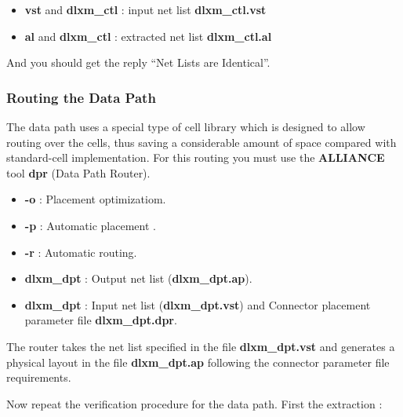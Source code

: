 \begin{itemize}
\item
{\bf vst} and {\bf dlxm\_ctl} : input net list {\bf dlxm\_ctl.vst}
\item
{\bf al} and {\bf dlxm\_ctl} : extracted net list {\bf dlxm\_ctl.al}
\end{itemize}

And you should get the reply ``Net Lists are Identical''.


    		\subsubsection{Routing the Data Path}

The data path uses a special type of cell library which is designed to allow routing over the cells, thus saving a considerable amount of space compared with standard-cell implementation. For this routing you must use the {\bf ALLIANCE} tool {\bf dpr} (Data Path Router).




\begin {itemize}
\item {\bf -o} : Placement optimizatiom.
\item {\bf -p} : Automatic placement .
\item {\bf -r} : Automatic  routing.
\item {\bf dlxm\_dpt} : Output net list ({\bf dlxm\_dpt.ap}).
\item {\bf dlxm\_dpt} : Input net list ({\bf dlxm\_dpt.vst}) and
Connector placement parameter file {\bf
dlxm\_dpt.dpr}.
\end{itemize}

The router takes the net list specified in the file {\bf
dlxm\_dpt.vst} and generates a physical layout in the file {\bf
dlxm\_dpt.ap} following the connector parameter file requirements. 


Now repeat the verification procedure for the data path. 
First the extraction :

